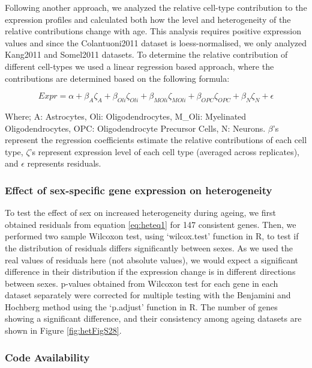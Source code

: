\documentclass[12pt,twoside]{unicam}
\begin{document}
Following another approach, we analyzed the relative cell-type contribution to the expression profiles and calculated both how the level and heterogeneity of the relative contributions change with age. This analysis requires positive expression values and since the Colantuoni2011 dataset is loess-normalised, we only analyzed Kang2011 and Somel2011 datasets. To determine the relative contribution of different cell-types we used a linear regression based approach, where the contributions are determined based on the following formula:

\begin{equation}
    Expr = \alpha + \beta_{A}\zeta_{A} + \beta_{Oli}\zeta_{Oli} + \beta_{MOli}\zeta_{MOli} + \beta_{OPC}\zeta_{OPC} + \beta_{N}\zeta_{N} + \epsilon
  \label{eq:heteq2}
\end{equation}

Where; A: Astrocytes, Oli: Oligodendrocytes, M\_Oli: Myelinated Oligodendrocytes, OPC: Oligodendrocyte Precursor Cells, N: Neurons. \(\beta\)'s represent the regression coefficients estimate the relative contributions of each cell type, \(\zeta\)'s represent expression level of each cell type (averaged across replicates), and \(\epsilon\) represents residuals.

\hypertarget{effect-of-sex-specific-gene-expression-on-heterogeneity}{%
\subsubsection{Effect of sex-specific gene expression on heterogeneity}\label{effect-of-sex-specific-gene-expression-on-heterogeneity}}

To test the effect of sex on increased heterogeneity during ageing, we first obtained residuals from equation \eqref{eq:heteq1} for 147 consistent genes. Then, we performed two sample Wilcoxon test, using `wilcox.test' function in R, to test if the distribution of residuals differs significantly between sexes. As we used the real values of residuals here (not absolute values), we would expect a significant difference in their distribution if the expression change is in different directions between sexes. p-values obtained from Wilcoxon test for each gene in each dataset separately were corrected for multiple testing with the Benjamini and Hochberg method using the `p.adjust' function in R. The number of genes showing a significant difference, and their consistency among ageing datasets are shown in Figure \ref{fig:hetFigS28}.

\hypertarget{code-availability}{%
\subsubsection{Code Availability}\label{code-availability}}
\end{document}

